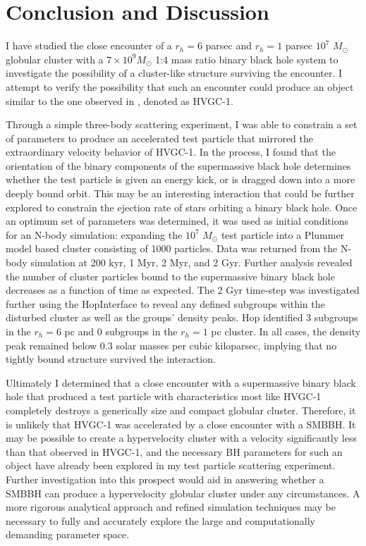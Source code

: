\documentclass{aastex62}
\begin{document}
\section{Conclusion and Discussion}
I have studied the close encounter of a $r_{h} = 6$ parsec and $r_{h} = 1$ parsec $10^7$ $M_{\odot}$ globular cluster with a $7\times10^9 M_{\odot}$ 1:4 mass ratio binary black hole system to investigate the possibility of a cluster-like structure surviving the encounter. I attempt to verify the possibility that such an encounter could produce an object similar to the one observed in \citet{cald14}, denoted as HVGC-1. 

Through a simple three-body scattering experiment, I was able to constrain a set of parameters to produce an accelerated test particle that mirrored the extraordinary velocity behavior of HVGC-1. In the process, I found that the orientation of the binary components of the supermassive black hole determines whether the test particle is given an energy kick, or is dragged down into a more deeply bound orbit. This may be an interesting interaction that could be further explored to constrain the ejection rate of stars orbiting a binary black hole. Once an optimum set of parameters was determined, it was used as initial conditions for an N-body simulation: expanding the $10^7$ $M_{\odot}$ test particle into a Plummer model based cluster consisting of 1000 particles. Data was returned from the N-body simulation at 200 kyr, 1 Myr, 2 Myr, and 2 Gyr. Further analysis revealed the number of cluster particles bound to the supermassive binary black hole decreases as a function of time as expected. The 2 Gyr time-step was investigated further using the HopInterface to reveal any defined subgroups within the disturbed cluster as well as the groups' density peaks. Hop identified 3 subgroups in the $r_{h} = 6$ pc and 0 subgroups in the $r_{h} = 1$ pc cluster. In all cases, the density peak remained below $0.3$ solar masses per cubic kiloparsec, implying that no tightly bound structure survived the interaction. 

Ultimately I determined that a close encounter with a supermassive binary black hole that produced a test particle with characteristics most like HVGC-1 completely destroys a generically size and compact globular cluster. Therefore, it is unlikely that HVGC-1 was accelerated by a close encounter with a SMBBH. It may be possible to create a hypervelocity cluster with a velocity significantly less than that observed in HVGC-1, and the necessary BH parameters for such an object have already been explored in my test particle scattering experiment. Further investigation into this prospect would aid in answering whether a SMBBH can produce a hypervelocity globular cluster under any circumstances. A more rigorous analytical approach and refined simulation techniques may be necessary to fully and accurately explore the large and computationally demanding parameter space.
\end{document}
